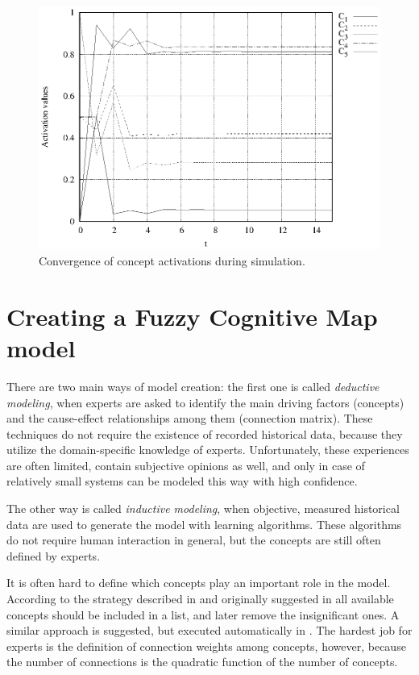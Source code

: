\documentclass[graybox]{svmult}
\begin{document}
\begin{figure}[hbt]
  \sidecaption
  \includegraphics[scale=0.55]{simulation/simulation.eps}
  \caption{Convergence of concept activations during simulation.}
  \label{fig:exampleConvergence}
\end{figure}

\section{Creating a Fuzzy Cognitive Map model}

There are two main ways of model creation: the first one is called \emph{deductive modeling}, when experts are asked to identify the main driving factors (concepts) and the cause-effect relationships among them (connection matrix). These techniques do not require the existence of recorded historical data, because they utilize the domain-specific knowledge of experts. Unfortunately, these experiences are often limited, contain subjective opinions as well, and only in case of relatively small systems can be modeled this way with high confidence.

The other way is called \emph{inductive modeling}, when objective, measured historical data are used to generate the model with learning algorithms. These algorithms do not require human interaction in general, but the concepts are still often defined by experts. 

It is often hard to define which concepts play an important role in the model. According to the strategy described in \cite{stachw.kurganl.pedryczw.2010} and originally suggested in \cite{b.kosko1986,khan2004group} all available concepts should be included in a list, and later remove the insignificant ones. A similar approach is suggested, but executed automatically in \cite{hatwagner2018two}. The hardest job for experts is the definition of connection weights among concepts, however, because the number of connections is the quadratic function of the number of concepts.
\end{document}
